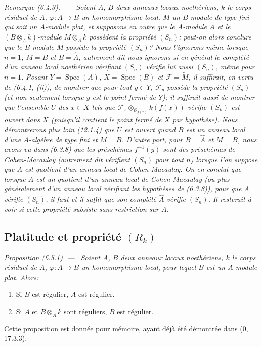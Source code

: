 \documentclass[10pt,oneside]{book}
\makeatletter
\newcommand{\oldpage}[2][]{%
  \setcounter{footnote}{0}%
  \marginpar{\scriptsize\textbf{#1}~|~#2}\ignorespaces}
\newenvironment{proposition}[1][]{%
  \par\medskip\noindent\itshape Proposition (#1). ---\ }{\par}
\newenvironment{remark}[1][]{%
  \par\medskip\noindent\itshape Remarque (#1). ---\ }{\par}
\newcommand{\EGAReaderTarget}[2]{\hypertarget{#1}{}\@bsphack\begingroup\def\@currentHref{#1}\label{#2}\endgroup\@esphack}
\makeatother
\begin{document}
\begin{remark}[6.4.3]
\label{IV.2.s6.4.3-fr}
Soient $A$, $B$ deux anneaux locaux noethériens, $k$ le corps résiduel de
$A$, $\varphi:A\to B$ un homomorphisme local, $M$ un $B$-module de type fini
qui soit un $A$-module plat, et supposons en outre que le $A$-module $A$ et le
$(B\otimes_Ak)$-module $M\otimes_Ak$ possèdent la propriété $(S_n)$; peut-on
alors conclure que le $B$-module $M$ possède la propriété $(S_n)$? Nous
l'ignorons même lorsque $n=1$, $M=B$ et $B=\widehat A$, autrement dit nous
ignorons si en général le \emph{complété} d'un anneau local noethérien
vérifiant $(S_n)$ vérifie lui aussi $(S_n)$, même pour $n=1$. Posant
$Y=\operatorname{Spec}(A)$, $X=\operatorname{Spec}(B)$ et
$\mathscr F=\widetilde M$, il suffirait, en vertu de (6.4.1, (ii)), de montrer
que pour \emph{tout} $y\in Y$, $\mathscr F_y$ possède la propriété $(S_n)$
(et non seulement lorsque $y$ est le point fermé de $Y$); il suffirait aussi
de montrer que l'ensemble $U$ des $x\in X$ tels que
$\mathscr F_x\otimes_{\mathcal O_{f(x)}}k(f(x))$ vérifie $(S_k)$ est ouvert
dans $X$ (puisqu'il contient le point fermé de $X$ par hypothèse). Nous
démontrerons plus loin (12.1.4) que $U$ est ouvert quand $B$ est un anneau
local d'une $A$-algèbre de type fini et $M=B$. D'autre part, pour
$B=\widehat A$ et $M=B$, nous avons vu dans (6.3.8) que les préschémas
$f^{-1}(y)$ sont des préschémas de Cohen-Macaulay (autrement dit vérifient
$(S_n)$ pour \emph{tout} $n$) lorsque l'on suppose que $A$ est quotient d'un
anneau local de Cohen-Macaulay. On en conclut que lorsque $A$ est un quotient
d'un anneau local de Cohen-Macaulay (ou plus généralement d'un anneau local
vérifiant les hypothèses de (6.3.8)), \emph{pour que $A$ vérifie $(S_n)$, il
faut et il suffit que son complété $\widehat A$ vérifie $(S_n)$}. Il resterait
à voir si cette propriété subsiste sans restriction sur $A$.
\end{remark}

\oldpage[IV-2]{143}

\subsection{\texorpdfstring{Platitude et propriété $(R_k)$}{Platitude et propriété (R\string_k)}}

\begin{proposition}[6.5.1]
\EGAReaderTarget{ega4.c04.prop.6-5-1}{IV.2.s6.5.1-fr}
Soient $A$, $B$ deux anneaux locaux noethériens, $k$ le corps résiduel
de $A$, $\varphi:A\to B$ un homomorphisme local, pour lequel $B$ est un
$A$-module plat. Alors:
\begin{enumerate}
\item[(i)] Si $B$ est régulier, $A$ est régulier.
\item[(ii)] Si $A$ et $B\otimes_Ak$ sont réguliers, $B$ est régulier.
\end{enumerate}
Cette proposition est donnée pour mémoire, ayant déjà été démontrée dans
(0, 17.3.3).
\end{proposition}
\end{document}
